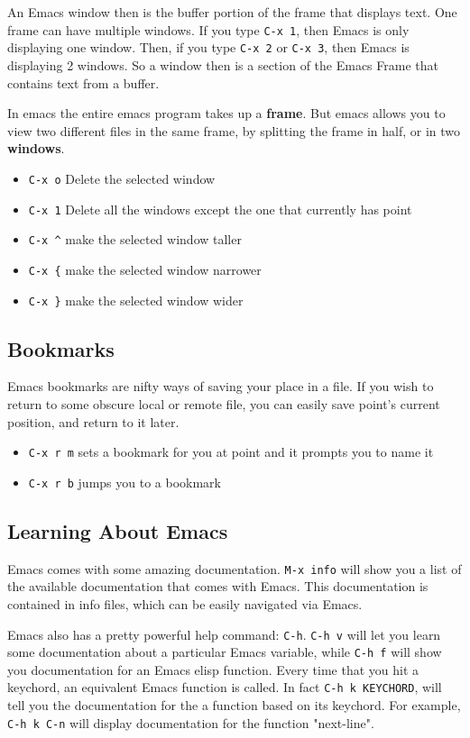 \documentclass[11pt]{article}
\begin{document}
An Emacs window then is the buffer portion of the frame that displays text.  One frame can have multiple windows.  If you type \texttt{C-x 1}, then Emacs is only displaying one window.  Then, if you type \texttt{C-x 2} or \texttt{C-x 3}, then Emacs is displaying 2 windows.  So a window then is a section of the Emacs Frame that contains text from a buffer.

In emacs the entire emacs program takes up a \textbf{frame}.  But emacs allows you to view two different files in the same frame, by splitting the frame in half, or in two \textbf{windows}.
\begin{itemize}
\item \texttt{C-x o} Delete the selected window
\item \texttt{C-x 1} Delete all the windows except the one that currently has point
\item \texttt{C-x \textasciicircum{}} make the selected window taller
\item \texttt{C-x \{} make the selected window narrower
\item \texttt{C-x \}} make the selected window wider
\end{itemize}
\subsection{Bookmarks}
\label{sec:orgheadline6}
Emacs bookmarks are nifty ways of saving your place in a file.  If you wish to return to some obscure local or remote file, you can easily save point's current position, and return to it later.

\begin{itemize}
\item \texttt{C-x r m}  sets a bookmark for you at point and it prompts you to name it
\item \texttt{C-x r b}  jumps you to a bookmark
\end{itemize}
\subsection{Learning About Emacs}
\label{sec:orgheadline7}
Emacs comes with some amazing documentation.  \texttt{M-x info} will show you a list of the available documentation that comes with Emacs.  This documentation is contained in info files, which can be easily navigated via Emacs.

Emacs also has a pretty powerful help command:  \texttt{C-h}.  \texttt{C-h v} will let you learn some documentation about a particular Emacs variable, while \texttt{C-h f} will show you documentation for an Emacs elisp function.  Every time that you hit a keychord, an equivalent Emacs function is called.  In fact \texttt{C-h k KEYCHORD}, will tell you the documentation for the a function based on its keychord.  For example, \texttt{C-h k C-n} will display documentation for the function "next-line".
\end{document}
